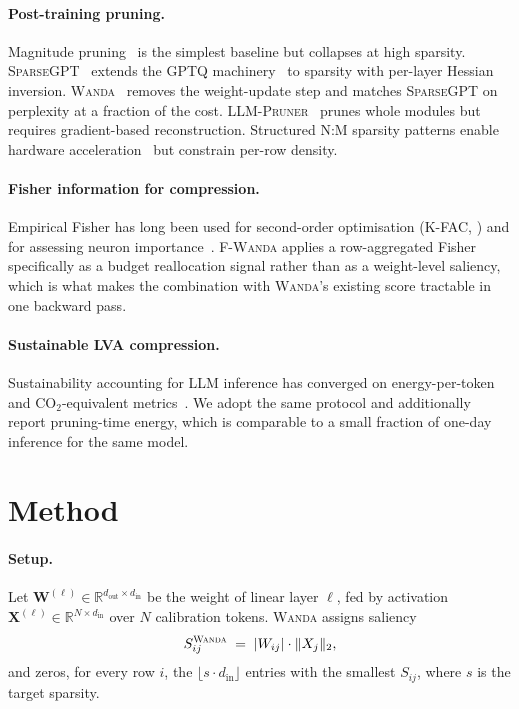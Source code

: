 \documentclass[11pt]{article}
\newcommand{\fwanda}{\textsc{F-Wanda}}
\newcommand{\wanda}{\textsc{Wanda}}
\newcommand{\sgpt}{\textsc{SparseGPT}}
\begin{document}
\paragraph{Post-training pruning.}
Magnitude pruning~\citep{han2015deepcompression} is the simplest baseline but
collapses at high sparsity. \sgpt{}~\citep{frantar2023sparsegpt} extends the
GPTQ machinery~\citep{frantar2023gptq} to sparsity with per-layer Hessian
inversion. \wanda{}~\citep{sun2024wanda} removes the weight-update step and
matches \sgpt{} on perplexity at a fraction of the cost.
\textsc{LLM-Pruner}~\citep{ma2023llmpruner} prunes whole modules but requires
gradient-based reconstruction. Structured N:M sparsity patterns enable
hardware acceleration~\citep{nvidia2020nm} but constrain per-row density.

\paragraph{Fisher information for compression.}
Empirical Fisher has long been used for second-order optimisation
(K-FAC, \citealp{martens2015kfac}) and for assessing neuron
importance~\citep{theis2018fisherpruning,liu2021groupfisher}. \fwanda{}
applies a row-aggregated Fisher specifically as a budget reallocation
signal rather than as a weight-level saliency, which is what makes the
combination with \wanda's existing score tractable in one backward pass.

\paragraph{Sustainable LVA compression.}
Sustainability accounting for LLM inference has converged on energy-per-token
and CO$_2$-equivalent metrics~\citep{schwartz2020greenai,
strubell2019energypolicy, henderson2022mlco2}. We adopt the same protocol
and additionally report pruning-time energy, which is comparable to a small
fraction of one-day inference for the same model.

\section{Method}

\paragraph{Setup.}
Let $\mathbf{W}^{(\ell)} \in \mathbb{R}^{d_\text{out}\times d_\text{in}}$ be
the weight of linear layer $\ell$, fed by activation
$\mathbf{X}^{(\ell)} \in \mathbb{R}^{N \times d_\text{in}}$ over $N$
calibration tokens. \wanda{} assigns saliency
\begin{equation}
S_{ij}^{\textsc{Wanda}} \;=\; |W_{ij}| \cdot \|X_j\|_2,
\label{eq:wanda}
\end{equation}
and zeros, for every row $i$, the $\lfloor s\cdot d_\text{in} \rfloor$ entries
with the smallest $S_{ij}$, where $s$ is the target sparsity.
\end{document}
